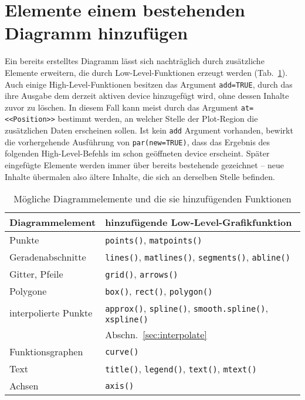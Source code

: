 \section{Elemente einem bestehenden Diagramm hinzufügen}
\label{sec:graphAddElem}

Ein bereits erstelltes Diagramm lässt sich nachträglich durch zusätzliche Elemente erweitern, die durch Low-Level-Funktionen erzeugt werden (Tab.\ \ref{tab:addGraphElems}). Auch einige High-Level-Funktionen besitzen das Argument \lstinline!add=TRUE!, durch das ihre Ausgabe dem derzeit aktiven device hinzugefügt wird, ohne dessen Inhalte zuvor zu löschen. In diesem Fall kann meist durch das Argument \lstinline!at=<<Position>>! bestimmt werden, an welcher Stelle der Plot-Region die zusätzlichen Daten erscheinen sollen. Ist kein \lstinline!add! Argument vorhanden, bewirkt die vorhergehende Ausführung von \lstinline!par(new=TRUE)!, dass das Ergebnis des folgenden High-Level-Befehls im schon geöffneten device erscheint. Später eingefügte Elemente werden immer über bereits bestehende gezeichnet -- neue Inhalte übermalen also ältere Inhalte, die sich an derselben Stelle befinden.

\begin{table}[ht]
\centering
\caption{Mögliche Diagrammelemente und die sie hinzufügenden Funktionen}
\label{tab:addGraphElems}
\begin{tabular}{p{3.5cm}p{9cm}}
\hline
\sffamily Diagrammelement & \sffamily hinzufügende Low-Level-Grafikfunktion\\\hline\hline
Punkte & \lstinline!points()!, \lstinline!matpoints()!\\
Geradenabschnitte & \lstinline!lines()!, \lstinline!matlines()!, \lstinline!segments()!, \lstinline!abline()!\\
Gitter, Pfeile & \lstinline!grid()!, \lstinline!arrows()!\\
Polygone & \lstinline!box()!, \lstinline!rect()!, \lstinline!polygon()!\\
interpolierte Punkte & \lstinline!approx()!, \lstinline!spline()!, \lstinline!smooth.spline()!, \lstinline!xspline()!\\
                     & Abschn.\ \ref{sec:interpolate}\\
Funktionsgraphen & \lstinline!curve()!\\
Text & \lstinline!title()!, \lstinline!legend()!, \lstinline!text()!, \lstinline!mtext()!\\
Achsen & \lstinline!axis()!\\\hline
\end{tabular}
\end{table}

